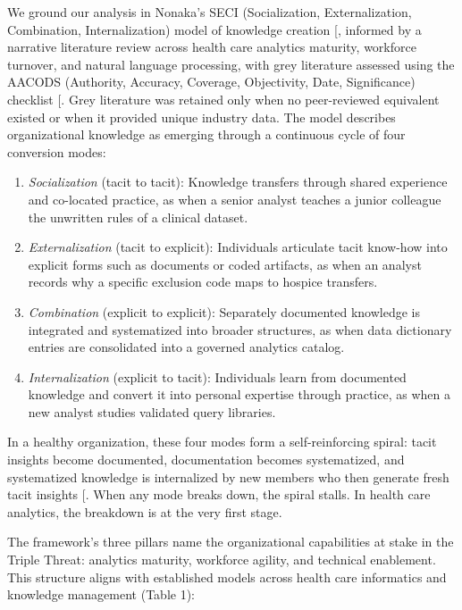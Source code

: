 \documentclass[
  american,
  11pt,
  letterpaper,
  oneside  ,captions=tableheading
]{scrartcl}
\providecommand{\tightlist}{%
  \setlength{\itemsep}{0pt}\setlength{\parskip}{0pt}}
\begin{document}
We ground our analysis in Nonaka's SECI (Socialization, Externalization,
Combination, Internalization) model of knowledge creation
{[}\citeproc{ref-farnese2019}{20}{]}, informed by a narrative literature
review across health care analytics maturity, workforce turnover, and
natural language processing, with grey literature assessed using the
AACODS (Authority, Accuracy, Coverage, Objectivity, Date, Significance)
checklist {[}\citeproc{ref-tyndall2010}{21}{]}. Grey literature was
retained only when no peer-reviewed equivalent existed or when it
provided unique industry data. The model describes organizational
knowledge as emerging through a continuous cycle of four conversion
modes:

\begin{enumerate}
\def\labelenumi{\arabic{enumi}.}
\tightlist
\item
  \emph{Socialization} (tacit to tacit): Knowledge transfers through
  shared experience and co-located practice, as when a senior analyst
  teaches a junior colleague the unwritten rules of a clinical dataset.
\item
  \emph{Externalization} (tacit to explicit): Individuals articulate
  tacit know-how into explicit forms such as documents or coded
  artifacts, as when an analyst records why a specific exclusion code
  maps to hospice transfers.
\item
  \emph{Combination} (explicit to explicit): Separately documented
  knowledge is integrated and systematized into broader structures, as
  when data dictionary entries are consolidated into a governed
  analytics catalog.
\item
  \emph{Internalization} (explicit to tacit): Individuals learn from
  documented knowledge and convert it into personal expertise through
  practice, as when a new analyst studies validated query libraries.
\end{enumerate}

In a healthy organization, these four modes form a self-reinforcing
spiral: tacit insights become documented, documentation becomes
systematized, and systematized knowledge is internalized by new members
who then generate fresh tacit insights
{[}\citeproc{ref-farnese2019}{20}{]}. When any mode breaks down, the
spiral stalls. In health care analytics, the breakdown is at the very
first stage.

The framework's three pillars name the organizational capabilities at
stake in the Triple Threat: analytics maturity, workforce agility, and
technical enablement. This structure aligns with established models
across health care informatics and knowledge management (Table 1):
\end{document}
